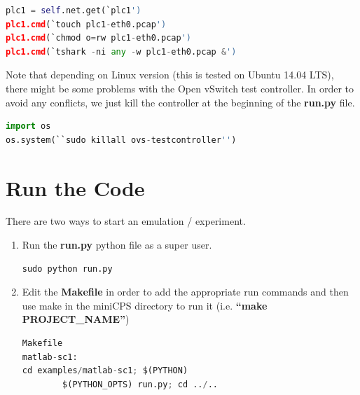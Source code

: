 \documentclass[book,a4paper,12pt]{memoir}
\begin{document}
\begin{lstlisting}[backgroundcolor = \color{ultralightgray}, language = Python, xleftmargin = 0.1cm, framexleftmargin = 0.3em, showstringspaces=false]
plc1 = self.net.get(`plc1')
plc1.cmd(`touch plc1-eth0.pcap')
plc1.cmd(`chmod o=rw plc1-eth0.pcap')
plc1.cmd(`tshark -ni any -w plc1-eth0.pcap &')
\end{lstlisting}


\noindent Note that depending on Linux version (this is tested on Ubuntu 14.04 LTS), there might be some problems with the Open vSwitch test controller.  In order to avoid any conflicts, we just kill the controller at the beginning of the \textbf{run.py} file.

\begin{lstlisting}[backgroundcolor = \color{ultralightgray}, language = Python, xleftmargin = 0.1cm, framexleftmargin = 0.3em, showstringspaces=false]
import os
os.system(``sudo killall ovs-testcontroller'')
\end{lstlisting}


\newpage
\section{Run the Code}
\label{cha:basicuse-sec:runthecode}
There are two ways to start an emulation / experiment.

\begin{enumerate}
\item Run the \textbf{run.py} python file as a super user.

\begin{lstlisting}[backgroundcolor = \color{ultralightgray}, language = Python, xleftmargin = 0.1cm, framexleftmargin = 0.3em, showstringspaces=false]
sudo python run.py
\end{lstlisting}


\item Edit the \textbf{Makefile} in order to add the appropriate run commands and then use make in the miniCPS directory to run it (i.e. \textbf{``make PROJECT\_NAME''})

\begin{lstlisting}[backgroundcolor = \color{ultralightgray}, language = Python, xleftmargin = 0.1cm, framexleftmargin = 0.3em, showstringspaces=false]
Makefile
matlab-sc1:
cd examples/matlab-sc1; $(PYTHON) 
        $(PYTHON_OPTS) run.py; cd ../..
\end{lstlisting}
\end{enumerate}
\end{document}
